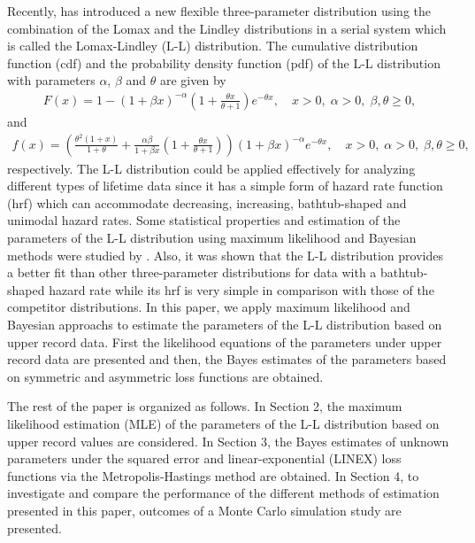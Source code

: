 \documentclass[twoside]{article}
\begin{document}
Recently, \cite{3} has introduced a new flexible three-parameter distribution using the combination of the Lomax and the Lindley distributions in a serial system which is called the Lomax-Lindley (L-L) distribution. The cumulative distribution function (cdf) and the probability density function (pdf) of the L-L distribution with parameters $\alpha$, $\beta$ and $\theta$ are given by
\begin{eqnarray} \label{1}
F(x) = 1 - {\left( {1 + \beta x} \right)^{ - \alpha }}\left( {1 + \frac{{\theta x}}{{\theta  + 1}}} \right){e^{ - \theta x}},\quad x > 0,\; \alpha  > 0,\; \beta ,\theta  \ge 0,
\end{eqnarray}
and
\begin{eqnarray} \label{2}
f(x) = \left( {\frac{{{\theta ^2}(1 + x)}}{{1 + \theta }} + \frac{{\alpha \beta }}{{1 + \beta x}}\left( {1 + \frac{{\theta x}}{{\theta  + 1}}} \right)} \right){\left( {1 + \beta x} \right)^{ - \alpha }}{e^{ - \theta x}},\quad x > 0,\; \alpha  > 0,\; \beta ,\theta  \ge 0,
\end{eqnarray}
respectively. The L-L distribution could be applied effectively for analyzing different types of lifetime data since it has a simple form of hazard rate function (hrf) which can accommodate decreasing, increasing, bathtub-shaped and unimodal hazard rates. Some statistical properties and estimation of the parameters of the L-L distribution using maximum likelihood and Bayesian methods were studied by \cite{3,4}. Also, it was shown that the L-L distribution provides a better fit than other three-parameter distributions for data with a bathtub-shaped hazard rate while its hrf is very simple in comparison with those of the competitor distributions. In this paper, we apply maximum likelihood and Bayesian approachs to estimate the parameters of the L-L distribution based on upper record data. First the likelihood equations of the parameters under upper record data are presented and then, the Bayes estimates of the parameters based on symmetric and asymmetric loss functions are obtained. 

The rest of the paper is organized as follows. In Section 2, the maximum likelihood estimation (MLE) of the parameters of the L-L distribution based on upper record values are considered. In Section 3, the Bayes estimates of unknown parameters under the squared error and linear-exponential (LINEX) loss functions via the Metropolis-Hastings method are obtained. In Section 4, to investigate and compare the performance of the different methods of estimation presented in this paper, outcomes of a Monte Carlo simulation study are presented.
\end{document}
